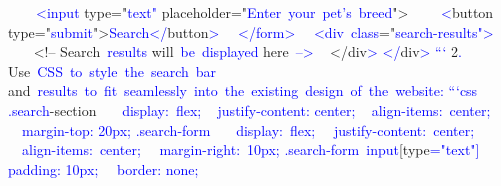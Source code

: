 \documentclass{article}
\begin{document}
\begin{tcolorbox}[colframe=black,colback=white]
{}\textcolor{blue}{~~~}\textcolor{blue}{~<}\textcolor{blue}{input} type="\textcolor{blue}{text}\textcolor{blue}{"} placeholder="\textcolor{blue}{Enter}\textcolor{blue}{~your}\textcolor{blue}{~pet}\textcolor{blue}{'s}\textcolor{blue}{~breed}">
\textcolor{blue}{~~~}\textcolor{blue}{~<}button type="\textcolor{blue}{submit}">\textcolor{blue}{Search}\textcolor{blue}{</}button\textcolor{blue}{>
}\textcolor{blue}{~}\textcolor{blue}{~</}\textcolor{blue}{form}\textcolor{blue}{>
}\textcolor{blue}{~}\textcolor{blue}{~<}\textcolor{blue}{div}\textcolor{blue}{~class}="\textcolor{blue}{search}\textcolor{blue}{-results}\textcolor{blue}{">
}\textcolor{blue}{~~~} <!-- Search\textcolor{blue}{~results} will\textcolor{blue}{~be}\textcolor{blue}{~displayed} here\textcolor{blue}{~-->
}\textcolor{blue}{~} </div\textcolor{blue}{>
}\textcolor{blue}{</}div\textcolor{blue}{>
}\textcolor{blue}{``}\textcolor{blue}{`
}2\textcolor{blue}{.} Use\textcolor{blue}{~CSS}\textcolor{blue}{~to}\textcolor{blue}{~style}\textcolor{blue}{~the}\textcolor{blue}{~search}\textcolor{blue}{~bar} and\textcolor{blue}{~results}\textcolor{blue}{~to}\textcolor{blue}{~fit}\textcolor{blue}{~seamlessly}\textcolor{blue}{~into}\textcolor{blue}{~the}\textcolor{blue}{~existing}\textcolor{blue}{~design}\textcolor{blue}{~of}\textcolor{blue}{~the}\textcolor{blue}{~website}\textcolor{blue}{:
}\textcolor{blue}{```}\textcolor{blue}{css}\textcolor{blue}{
}\textcolor{blue}{.search}-section\textcolor{blue}{~{
}\textcolor{blue}{~}\textcolor{blue}{~display}\textcolor{blue}{:}\textcolor{blue}{~flex}\textcolor{blue}{;
}\textcolor{blue}{~} justify-content: center\textcolor{blue}{;
}\textcolor{blue}{~} align-items:\textcolor{blue}{~center}\textcolor{blue}{;
}\textcolor{blue}{~}\textcolor{blue}{~margin}-top: \textcolor{blue}{20}\textcolor{blue}{px}\textcolor{blue}{;
}\textcolor{blue}{}
}\textcolor{blue}{.search}\textcolor{blue}{-form}\textcolor{blue}{~{
}\textcolor{blue}{~}\textcolor{blue}{~display}:\textcolor{blue}{~flex};
\textcolor{blue}{~}\textcolor{blue}{~justify}\textcolor{blue}{-content}:\textcolor{blue}{~center};
\textcolor{blue}{~}\textcolor{blue}{~align}\textcolor{blue}{-items}:\textcolor{blue}{~center};
\textcolor{blue}{~}\textcolor{blue}{~margin}\textcolor{blue}{-right}:\textcolor{blue}{~}10\textcolor{blue}{px}\textcolor{blue}{;
}}
\textcolor{blue}{.search}\textcolor{blue}{-form}\textcolor{blue}{~input}[type\textcolor{blue}{="}\textcolor{blue}{text}\textcolor{blue}{"]}\textcolor{blue}{~{
}\textcolor{blue}{~} padding\textcolor{blue}{:} \textcolor{blue}{10}px\textcolor{blue}{;
}\textcolor{blue}{~}\textcolor{blue}{~border}: none;
}
\end{tcolorbox}
\end{document}
